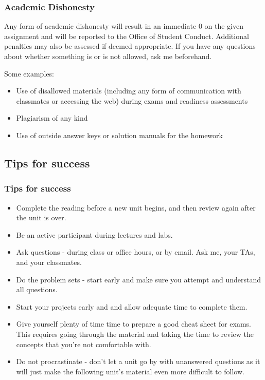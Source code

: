 \documentclass[slidestop,compress,mathserif,12pt,t,professionalfonts,xcolor=table]{beamer}
\begin{document}
\begin{frame}
\frametitle{Academic Dishonesty}

Any form of academic dishonesty will result in an immediate 0 on the given assignment 
and will be reported to the Office of Student Conduct. Additional penalties may also 
be assessed if deemed appropriate. If you have any questions about whether something 
is or is not allowed, ask me beforehand.

Some examples:

\begin{itemize}

\item Use of disallowed materials (including any form of communication with classmates 
or accessing the web) during exams and readiness assessments

\item Plagiarism of any kind

\item Use of outside answer keys or solution manuals for the homework

\end{itemize}

\end{frame}


\subsection{Tips for success}


\begin{frame}
\frametitle{Tips for success}

{\footnotesize
\begin{itemize}[<alert@+>]
\item Complete the reading before a new unit begins, and then review again after the 
unit is over.
\item Be an active participant during lectures and labs.
\item Ask questions - during class or office hours, or by email. Ask me, your TAs, and 
your classmates.
\item Do the problem sets - start early and make sure you attempt and understand all 
questions.
\item Start your projects early and and allow adequate time to complete them.
\item Give yourself plenty of time time to prepare a good cheat sheet for exams. This 
requires going through the material and taking the time to review the concepts that 
you're not comfortable with.
\item Do not procrastinate - don't let a unit go by with unanswered questions as it 
will just make the following unit's material even more difficult to follow. 
\end{itemize}
}

\end{frame}
\end{document}
